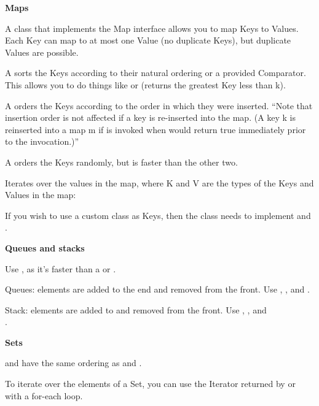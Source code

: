 
\textbf{Maps}

A class that implements the Map interface allows you to map Keys to Values. Each Key can map to at most one Value (no duplicate Keys), but duplicate Values are possible. 

A  sorts the Keys according to their natural ordering or a provided Comparator. This allows you to do things like  or  (returns the greatest Key less than k).

A  orders the Keys according to the order in which they were inserted. “Note that insertion order is not affected if a key is re-inserted into the map. (A key k is reinserted into a map m if  is invoked when  would return true immediately prior to the invocation.)” 

A  orders the Keys randomly, but is faster than the other two.

Iterates over the values in the map, where K and V are the types of the Keys and Values in the map:



If you wish to use a custom class as Keys, then the class needs to implement  and .

\textbf{Queues and stacks}

Use , as it’s faster than a  or .

Queues: elements are added to the end and removed from the front. Use , , and .

Stack: elements are added to and removed from the front. Use , , and \\ .

\textbf{Sets}

 and  have the same ordering as  and .

To iterate over the elements of a Set, you can use the Iterator returned by  or with a for-each loop.

\newpage